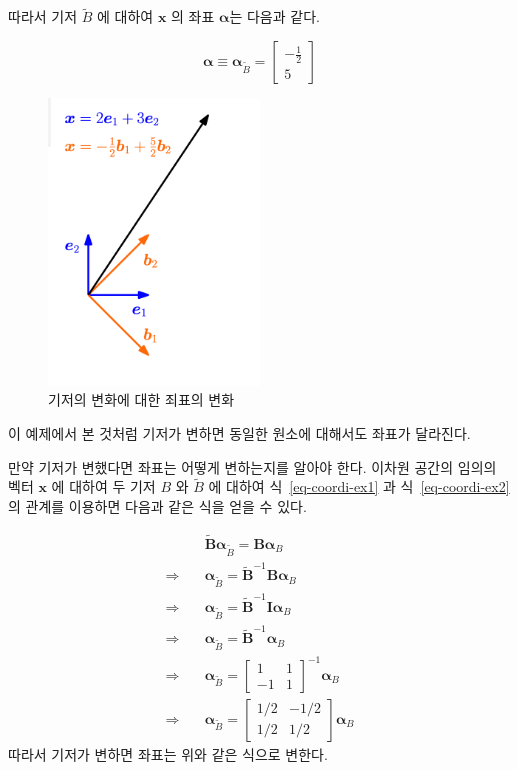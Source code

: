 \documentclass[
  11pt,
  a4paper,
  oneside]{scrbook}
\theoremstyle{definition}
\theoremstyle{definition}
\theoremstyle{plain}
\theoremstyle{remark}
\begin{document}
따라서 기저 \(\tilde B\) 에 대하여 \(\pmb x\) 의 좌표 \(\pmb \alpha\)는
다음과 같다.

\[
\pmb \alpha \equiv \pmb \alpha_{\tilde B} = 
\begin{bmatrix}
-\frac{1}{2} \\
5
\end{bmatrix}
\]

\begin{figure}[H]

{\centering \includegraphics[width=0.5\textwidth,height=\textheight]{qmds/../images/coordinate.png}

}

\caption{기저의 변화에 대한 죄표의 변화}

\end{figure}%

이 예제에서 본 것처럼 기저가 변하면 동일한 원소에 대해서도 좌표가
달라진다.

만약 기저가 변했다면 좌표는 어떻게 변하는지를 알아야 한다. 이차원 공간의
임의의 벡터 \(\pmb x\) 에 대하여 두 기저 \(B\) 와 \(\tilde B\) 에 대하여
식~\ref{eq-coordi-ex1} 과 식~\ref{eq-coordi-ex2} 의 관계를 이용하면
다음과 같은 식을 얻을 수 있다.

\[
\begin{aligned}
& \quad \tilde {\pmb B}  \pmb \alpha_{\tilde B} = \pmb B \pmb \alpha_B  \\
\Rightarrow  & \quad  \pmb \alpha_{\tilde B}  = \tilde {\pmb B}^{-1} \pmb B  \pmb \alpha_B  \\
\Rightarrow &  \quad   \pmb \alpha_{\tilde B}  =\tilde {\pmb B}^{-1} \pmb I \pmb \alpha_B  \\
\Rightarrow &  \quad   \pmb \alpha_{\tilde B}  =\tilde {\pmb B}^{-1} \pmb \alpha_B  \\
\Rightarrow  & \quad   \pmb \alpha_{\tilde B}  = 
\begin{bmatrix}
1 & 1 \\
-1 & 1 
\end{bmatrix}^{-1}
\pmb \alpha_B  \\
\Rightarrow  & \quad \pmb \alpha_{\tilde B} =
\begin{bmatrix}
1/2 & -1/2 \\
1/2 & 1/2 
\end{bmatrix}
\pmb \alpha_B 
\end{aligned}
\] 따라서 기저가 변하면 좌표는 위와 같은 식으로 변한다.
\end{document}
